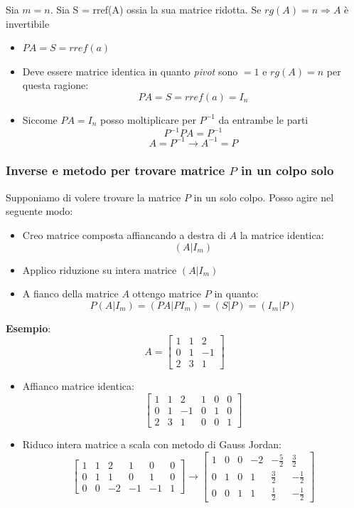 Sia $m=n$. Sia S = rref(A) ossia la sua matrice ridotta. Se $rg\left( A \right) = n \Rightarrow A $ è invertibile
\begin{itemize}
	\item $PA=S=rref\left( a \right) $
	\item Deve essere matrice identica in quanto \textit{pivot} sono $=1$ e $rg\left( A \right) =n$ per questa ragione:
	      \[
		      PA=S=rref\left( a \right) =I_n
	      \]
	\item Siccome $PA=I_n$ posso moltiplicare per $P^{-1}$ da entrambe le parti
	      \[
		      P^{-1}PA=P^{-1}
	      \]
	      \[
		      A=P^{-1} \rightarrow A^{-1}=P
	      \]
\end{itemize}
\subsubsection*{Inverse e metodo per trovare matrice $P$ in un colpo solo}
Supponiamo di volere trovare la matrice $P$ in un solo colpo. Posso agire nel seguente modo:
\begin{itemize}
	\item Creo matrice composta affiancando a destra di $A$ la matrice identica:
	      \[
		      \left( A|I_m \right)
	      \]
	\item Applico riduzione su intera matrice $ \left( A|I_m \right) $
	\item A fianco della matrice $A$ ottengo matrice $P$ in quanto:
	      \[
		      P\left( A|I_m \right) = \left( PA |PI_m \right) = \left( S| P \right) = \left( I_m | P\right)
	      \]
\end{itemize}
\textbf{Esempio}:
\[
	A= \begin{bmatrix}
		1 & 1 & 2  \\
		0 & 1 & -1 \\
		2 & 3 & 1
	\end{bmatrix}
\]
\begin{itemize}
	\item Affianco matrice identica:
	      \[
		      \begin{bmatrix}
			      1 & 1 & 2  & 1 & 0 & 0 \\
			      0 & 1 & -1 & 0 & 1 & 0 \\
			      2 & 3 & 1  & 0 & 0 & 1
		      \end{bmatrix}
	      \]
	\item Riduco intera matrice a scala con metodo di Gauss Jordan:
	      \[
		      \begin{bmatrix}
			      1 & 1 & 2  & 1  & 0  & 0 \\
			      0 & 1 & 1  & 0  & 1  & 0 \\
			      0 & 0 & -2 & -1 & -1 & 1
		      \end{bmatrix}
		      \rightarrow
		      \begin{bmatrix}
			      1 & 0 & 0 & -2 & - \frac{5}{2} & \frac{3}{2}  \\
			      0 & 1 & 0 & 1  & \frac{3}{2}   & -\frac{1}{2} \\
			      0 & 0 & 1 & 1  & \frac{1}{2}   & -\frac{1}{2}
		      \end{bmatrix}
	      \]
\end{itemize}

